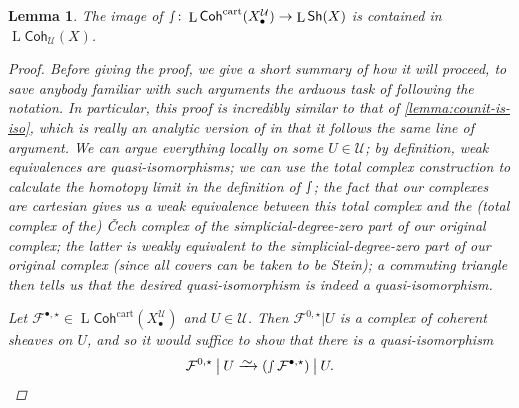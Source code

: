 \documentclass[11pt,fleqn]{article}
\theoremstyle{plain}
\newtheorem{lemma}[theorem]{Lemma}
\theoremstyle{definition}
\theoremstyle{remark}
\numberwithin{equation}{theorem}
\newcommand{\cover}{\mathcal{U}}
\newcommand{\anotherbullet}{\star}
\newcommand{\restricted}{\mathbin{\big\vert}}
\newcommand{\congto}{\xrightarrow{\raisebox{-.5ex}[0ex][0ex]{$\sim$}}}
\newcommand{\gshX}{\mathsf{Sh}(X)}
\newcommand{\gcohUX}{\mathsf{Coh}_{\cover}(X)}
\newcommand{\cartcohX}{\mathsf{Coh}^\mathrm{cart}(X_\bullet^\cover)}
\DeclareMathOperator{\LL}{L}
\begin{document}
        \begin{lemma}\label{lemma:image-of-int-is-in-cohU}
            The image of $\smallint\colon\LL{\cartcohX}\to\LL{\gshX}$ is contained in $\LL{\gcohUX}$.

            \begin{proof}
                Before giving the proof, we give a short summary of how it will proceed, to save anybody familiar with such arguments the arduous task of following the notation.
                In particular, this proof is incredibly similar to that of \cref{lemma:counit-is-iso}, which is really an analytic version of \cite[Lemma~2.2.2.13]{Toen&Vezzosi2008} in that it follows the same line of argument.
                We can argue everything locally on some $U\in\cover$; by definition, weak equivalences are quasi-isomorphisms; we can use the total complex construction to calculate the homotopy limit in the definition of $\smallint$; the fact that our complexes are cartesian gives us a weak equivalence between this total complex and the (total complex of the) Čech complex of the simplicial-degree-zero part of our original complex; the latter is weakly equivalent to the simplicial-degree-zero part of our original complex (since all covers can be taken to be Stein); a commuting triangle then tells us that the desired quasi-isomorphism is indeed a quasi-isomorphism.

                \medskip

                Let $\mathcal{F}^{\bullet,\anotherbullet}\in\LL{\cartcohX}$ and $U\in\cover$.
                Then $\mathcal{F}^{0,\anotherbullet}\restricted U$ is a complex of coherent sheaves on $U$, and so it would suffice to show that there is a quasi-isomorphism
                \[
                    \mathcal{F}^{0,\anotherbullet} \restricted U
                    \congto
                    \left(
                        \smallint \mathcal{F}^{\bullet,\anotherbullet}
                    \right) \restricted U.
                \]


\end{proof}
\end{lemma}
\end{document}
